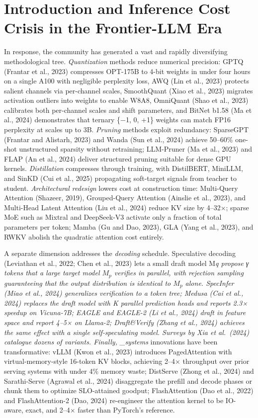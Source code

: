 \section{Introduction and Inference Cost Crisis in the Frontier-LLM Era}\label{introduction-and-inference-cost-crisis-in-the-frontier-llm-era}

In response, the community has generated a vast and rapidly diversifying methodological tree. \emph{Quantization} methods reduce numerical precision: GPTQ (Frantar et al., 2023) compresses OPT-175B to 4-bit weights in under four hours on a single A100 with negligible perplexity loss, AWQ (Lin et al., 2023) protects salient channels via per-channel scales, SmoothQuant (Xiao et al., 2023) migrates activation outliers into weights to enable W8A8, OmniQuant (Shao et al., 2023) calibrates both per-channel scales and shift parameters, and BitNet b1.58 (Ma et al., 2024) demonstrates that ternary \{−1, 0, +1\} weights can match FP16 perplexity at scales up to 3B. \emph{Pruning} methods exploit redundancy: SparseGPT (Frantar and Alistarh, 2023) and Wanda (Sun et al., 2024) achieve 50--60\% one-shot unstructured sparsity without retraining; LLM-Pruner (Ma et al., 2023) and FLAP (An et al., 2024) deliver structured pruning suitable for dense GPU kernels. \emph{Distillation} compresses through training, with DistilBERT, MiniLLM, and SinKD (Cui et al., 2025) propagating soft-target signals from teacher to student. \emph{Architectural redesign} lowers cost at construction time: Multi-Query Attention (Shazeer, 2019), Grouped-Query Attention (Ainslie et al., 2023), and Multi-Head Latent Attention (Liu et al., 2024) reduce KV size by 4--32×; sparse MoE such as Mixtral and DeepSeek-V3 activate only a fraction of total parameters per token; Mamba (Gu and Dao, 2023), GLA (Yang et al., 2023), and RWKV abolish the quadratic attention cost entirely.

A separate dimension addresses the \emph{decoding} schedule. Speculative decoding (Leviathan et al., 2022; Chen et al., 2023) lets a small draft model M\emph{q propose γ tokens that a large target model \(M_p\) verifies in parallel, with rejection sampling guaranteeing that the output distribution is identical to \(M_p\) alone. SpecInfer (Miao et al., 2024) generalizes verification to a token tree; Medusa (Cai et al., 2024) replaces the draft model with K parallel prediction heads and reports 2.3× speedup on Vicuna-7B; EAGLE and EAGLE-2 (Li et al., 2024) draft in feature space and report 4--5× on Llama-2; Draft\&Verify (Zhang et al., 2024) achieves the same effect with a single self-speculating model. Surveys by Xia et al.~(2024) catalogue dozens of variants. Finally, \_systems} innovations have been transformative: vLLM (Kwon et al., 2023) introduces PagedAttention with virtual-memory-style 16-token KV blocks, achieving 2--4× throughput over prior serving systems with under 4\% memory waste; DistServe (Zhong et al., 2024) and Sarathi-Serve (Agrawal et al., 2024) disaggregate the prefill and decode phases or chunk them to optimize SLO-attained goodput; FlashAttention (Dao et al., 2022) and FlashAttention-2 (Dao, 2024) re-engineer the attention kernel to be IO-aware, exact, and 2--4× faster than PyTorch's reference.

